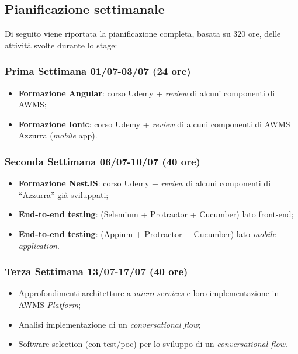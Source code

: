 \subsection{Pianificazione settimanale}
Di seguito viene riportata la pianificazione completa, basata su 320 ore, delle attività svolte durante lo stage:
\begin{trivlist}
	\item \subsubsection{Prima Settimana 01/07-03/07 (24 ore)}   
	\begin{itemize}
		\item \textbf{Formazione Angular}: corso Udemy + \emph{review} di alcuni componenti di \gls{AWMS};
		\item \textbf{Formazione Ionic}: corso Udemy + \emph{review} di alcuni componenti di \gls{AWMS} Azzurra (\emph{mobile} app).
	\end{itemize}  

\item \subsubsection{Seconda Settimana 06/07-10/07 (40 ore)}
\begin{itemize}
	\item \textbf{Formazione NestJS}: corso Udemy + \emph{review} di alcuni componenti di “Azzurra” già sviluppati;
	\item \textbf{End-to-end testing}: (Selemium + Protractor + Cucumber) lato \gls{front-end}\ap{[g]};
	\item \textbf{End-to-end testing}: (Appium + Protractor + Cucumber) lato \emph{mobile} \emph{application}.
\end{itemize}

\item \subsubsection{Terza Settimana 13/07-17/07 (40 ore)}
\begin{itemize}
	\item Approfondimenti architetture a \emph{micro-services} e loro implementazione in \gls{AWMS} \emph{Platform};
	\item Analisi implementazione di un \emph{conversational flow};
	\item Software selection (con test/poc) per lo sviluppo di un \emph{conversational flow}.
\end{itemize}	


\end{trivlist}
